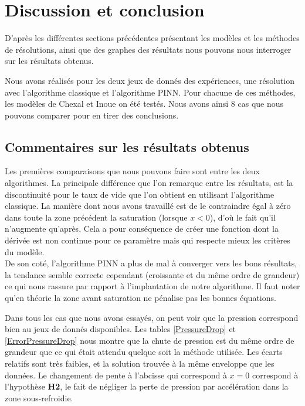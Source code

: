 \section{Discussion et conclusion}
D'après les différentes sections précédentes présentant les modèles et les méthodes de résolutions, ainsi que des graphes des résultats nous pouvons nous interroger sur les résultats obtenus.\\ \par

Nous avons réalisés pour les deux jeux de donnés des expériences, une résolution avec l'algorithme classique et l'algorithme PINN. Pour chacune de ces méthodes, les modèles de Chexal et Inoue on été testés. Nous avons ainsi 8 cas que nous pouvons comparer pour en tirer des conclusions.
\subsection{Commentaires sur les résultats obtenus}
Les premières comparaisons que nous pouvons faire sont entre les deux algorithmes. La principale différence que l'on remarque entre les résultats, est la discontinuité pour le taux de vide que l'on obtient en utilisant l'algorithme classique. La manière dont nous avons travaillé est de le contraindre égal à zéro dans toute la zone précédent la saturation (lorsque $x<0$), d'où le fait qu'il n'augmente qu'après. Cela a pour conséquence de créer une fonction dont la dérivée est non continue pour ce paramètre mais qui respecte mieux les critères du modèle.\\

De son coté, l'algorithme PINN a plus de mal à converger vers les bons résultats, la tendance semble correcte cependant (croissante et du même ordre de grandeur) ce qui nous rassure par rapport à l'implantation de notre algorithme. Il faut noter qu'en théorie la zone avant saturation ne pénalise pas les \og bonnes\fg{} équations.\\ \par

Dans tous les cas que nous avons essayés, on peut voir que la pression correspond bien au jeux de donnés disponibles. 
Les tables \ref{PressureDrop} et \ref{ErrorPressureDrop} nous montre que la chute de pression est du même ordre de grandeur que ce qui était attendu quelque soit la méthode utilisée. Les écarts relatifs sont très faibles, et la solution trouvée à la même enveloppe que les données. Le changement de pente à l'abcisse qui correspond à $x=0$ correspond à l'hypothèse \textbf{H2}, le fait de négliger la perte de pression par accélération dans la zone sous-refroidie.\\

